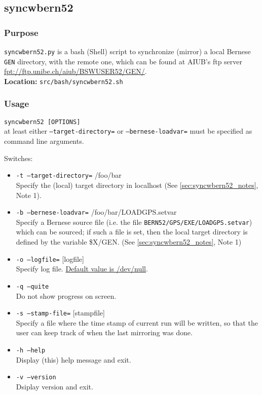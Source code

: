 \subsection{syncwbern52}
\label{syncwbern52}

\subsubsection{Purpose}
\texttt{syncwbern52.py} is a bash (Shell) script to synchronize (mirror) a local Bernese \texttt{GEN}
directory, with the remote one, which can be found at AIUB's ftp server
\url{fpt://ftp.unibe.ch/aiub/BSWUSER52/GEN/}.\\
\textbf{Location:} \texttt{src/bash/syncwbern52.sh}

\subsubsection{Usage}
\texttt{syncwbern52 [OPTIONS]}\\
at least either \texttt{--target-directory=} or \texttt{--bernese-loadvar=}
must be specified as command line arguments.


Switches:
\begin{itemize}
\item \texttt{-t --target-directory=} /foo/bar\\
Specify the (local) target directory in localhost (See \autoref{sec:syncwbern52_notes}, Note 1).
\item \texttt{-b --bernese-loadvar=} /foo/bar/LOADGPS.setvar\\
Specify a Bernese source file (i.e. the file \texttt{BERN52/GPS/EXE/LOADGPS.setvar}) 
which can be sourced; if such a file is set, then the local target 
directory is defined by the variable \$X/GEN. (See \autoref{sec:syncwbern52_notes}, Note 1)
\item \texttt{-o --logfile=} [logfile]\\
Specify log file. \underline{Default value is /dev/null}.
\item \texttt{-q --quite}\\
Do not show progress on screen.
\item \texttt{-s --stamp-file=} [stampfile]\\
Specify a file where the time stamp of current run will be written, 
so that the user can keep track of when the last mirroring was done.
\item \texttt{-h --help}\\
Display (this) help message and exit.
\item \texttt{-v --version}\\
Dsiplay version and exit.
\end{itemize}


